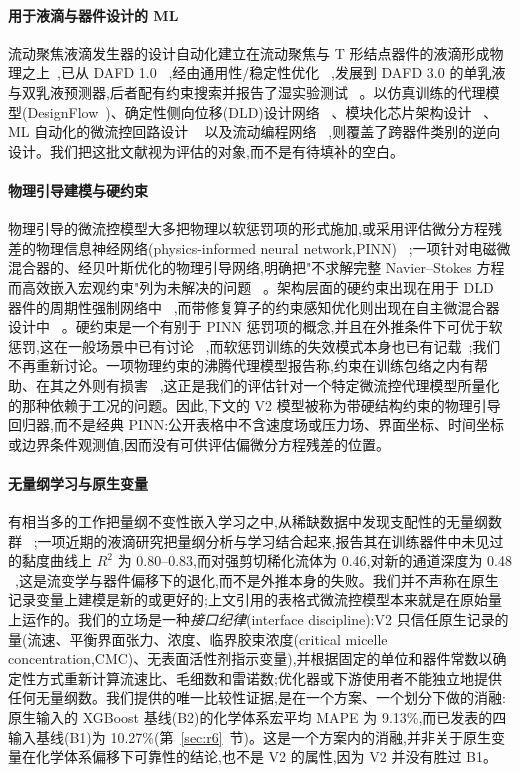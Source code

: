 \documentclass[11pt,a4paper]{ctexart}
\begin{document}
\paragraph{用于液滴与器件设计的 ML} 流动聚焦液滴发生器的设计自动化建立在流动聚焦与 T 形结点器件的液滴形成物理之上~\cite{anna2003,garstecki2006},已从 DAFD 1.0 ~\cite{lashkaripour2021},经由通用性/稳定性优化 ~\cite{mcintyre2023},发展到 DAFD 3.0 的单乳液与双乳液预测器,后者配有约束搜索并报告了湿实验测试 ~\cite{lashkaripour2024}。以仿真训练的代理模型(DesignFlow~\cite{samari2025})、确定性侧向位移(DLD)设计网络 ~\cite{vatandoust2022}、模块化芯片架构设计 ~\cite{li2026pathchip}、ML 自动化的微流控回路设计 ~\cite{mufg2026} 以及流动编程网络 ~\cite{ceyehao2026},则覆盖了跨器件类别的逆向设计。我们把这批文献视为评估的对象,而不是有待填补的空白。

\paragraph{物理引导建模与硬约束} 物理引导的微流控模型大多把物理以软惩罚项的形式施加,或采用评估微分方程残差的物理信息神经网络(physics-informed neural network,PINN) ~\cite{raissi2019,karniadakis2021,bpgnn2026,flexpinn2026};一项针对电磁微混合器的、经贝叶斯优化的物理引导网络,明确把"不求解完整 Navier–Stokes 方程而高效嵌入宏观约束"列为未解决的问题 ~\cite{bpgnn2026}。架构层面的硬约束出现在用于 DLD 器件的周期性强制网络中 ~\cite{lee2025},而带修复算子的约束感知优化则出现在自主微混合器设计中 ~\cite{micromixer2026}。硬约束是一个有别于 PINN 惩罚项的概念,并且在外推条件下可优于软惩罚,这在一般场景中已有讨论 ~\cite{naturecs2021,lu2021,beucler2021,baty2023,prnet2026},而软惩罚训练的失效模式本身也已有记载~\cite{krishnapriyan2021};我们不再重新讨论。一项物理约束的沸腾代理模型报告称,约束在训练包络之内有帮助、在其之外则有损害 ~\cite{filmpinn2026},这正是我们的评估针对一个特定微流控代理模型所量化的那种依赖于工况的问题。因此,下文的 V2 模型被称为带硬结构约束的物理引导回归器,而不是经典 PINN:公开表格中不含速度场或压力场、界面坐标、时间坐标或边界条件观测值,因而没有可供评估偏微分方程残差的位置。

\paragraph{无量纲学习与原生变量} 有相当多的工作把量纲不变性嵌入学习之中,从稀缺数据中发现支配性的无量纲数群 ~\cite{xie2022,oppenheimer2023};一项近期的液滴研究把量纲分析与学习结合起来,报告其在训练器件中未见过的黏度曲线上 $R^2$ 为 0.80–0.83,而对强剪切稀化流体为 0.46,对新的通道深度为 0.48 ~\cite{labchip2025dimless},这是流变学与器件偏移下的退化,而不是外推本身的失败。我们并不声称在原生记录变量上建模是新的或更好的;上文引用的表格式微流控模型本来就是在原始量上运作的。我们的立场是一种\emph{接口纪律}(interface discipline):V2 只信任原生记录的量(流速、平衡界面张力、浓度、临界胶束浓度(critical micelle concentration,CMC)、无表面活性剂指示变量),并根据固定的单位和器件常数以确定性方式重新计算流速比、毛细数和雷诺数;优化器或下游使用者不能独立地提供任何无量纲数。我们提供的唯一比较性证据,是在一个方案、一个划分下做的消融:原生输入的 XGBoost 基线(B2)的化学体系宏平均 MAPE 为 9.13\%,而已发表的四输入基线(B1)为 10.27\%(第~\ref{sec:r6}~节)。这是一个方案内的消融,并非关于原生变量在化学体系偏移下可靠性的结论,也不是 V2 的属性,因为 V2 并没有胜过 B1。
\end{document}
